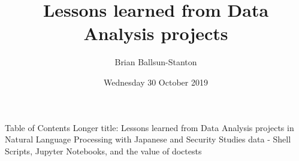 \documentclass[aspectratio=1610, 11pt]{beamer} %
\title{Lessons learned from Data Analysis projects} %
\author{Brian Ballsun-Stanton}               %
\institute{Faculty of Arts}         %
\date{Wednesday 30 October 2019}                 %
\begin{document}

\maketitle

  

\begin{frame}{Table of Contents}
Longer title: Lessons learned from Data Analysis projects in Natural Language Processing with Japanese and Security Studies data - Shell Scripts, Jupyter Notebooks, and the value of doctests
  \tableofcontents
\end{frame}
\end{document}
